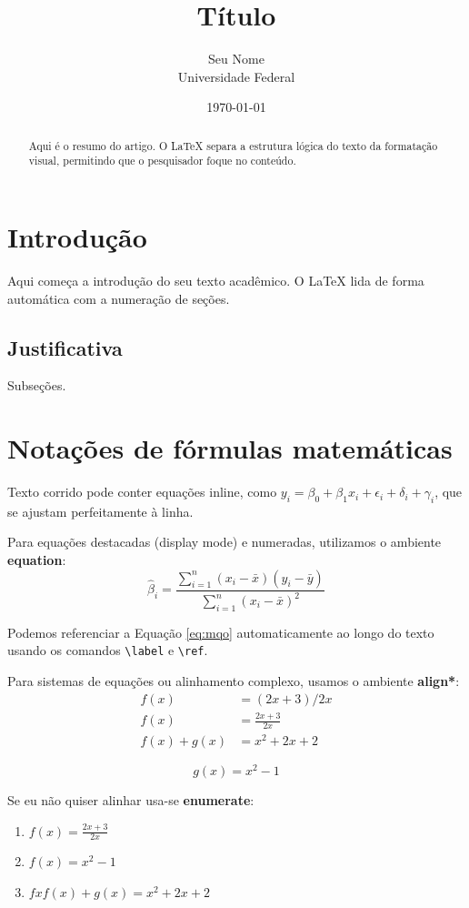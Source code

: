\documentclass[12pt, a4paper]{article}
\title{Título}
\author{Seu Nome \\ 
\small Universidade Federal}
\date{\today}
\begin{document}
\maketitle %

\begin{abstract}
Aqui é o resumo do artigo. O LaTeX separa a estrutura lógica do texto da formatação visual, permitindo que o pesquisador foque no conteúdo.
\end{abstract}

\section{Introdução}
Aqui começa a introdução do seu texto acadêmico. O LaTeX lida de forma automática com a numeração de seções.

\subsection{Justificativa}
Subseções.

\section{Notações de fórmulas  matemáticas}

Texto corrido pode conter equações inline, como $y_i = \beta_0 + \beta_1 x_i + \epsilon_i + \delta_i +\gamma_i$, que se ajustam perfeitamente à linha.

Para equações destacadas (display mode) e numeradas, utilizamos o ambiente \textbf{equation}:
\begin{equation}
    \hat{\beta}_i = \frac{\sum_{i=1}^{n} (x_i - \bar{x})(y_i - \bar{y})}{\sum_{i=1}^{n} (x_i - \bar{x})^2}
    \label{eq:mqo}
\end{equation}

Podemos referenciar a Equação \ref{eq:mqo} automaticamente ao longo do texto usando os comandos \texttt{\textbackslash label} e \texttt{\textbackslash ref}.

Para sistemas de equações ou alinhamento complexo, usamos o ambiente \textbf{align*}:
\begin{align*}
    f(x) &= (2x + 3)/2x \\
    f(x) &=\frac{2x+3}{2x} \\
    f(x) + g(x) &= x^2 + 2x + 2
\end{align*}

    \[g(x)= x^2 - 1\] 

Se eu não quiser alinhar usa-se \textbf{enumerate}: \\

\begin{enumerate}
\item[A)] $f(x)=\frac{2x+3}{2x}$ \\
\item[B)] $f(x)=x^2 - 1$ \\
\item [C)] $fxf(x) + g(x)= x^2 + 2x + 2$


\end{enumerate}
\end{document}
